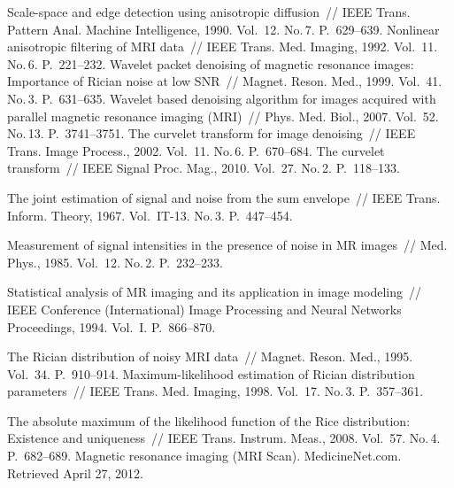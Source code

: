 \begin{multicols}{2}
{\small\frenchspacing
 {%
 \begin{thebibliography}{99}
 Scale-space and edge detection using anisotropic diffusion~// IEEE
Trans. Pattern Anal. Machine Intelligence, 1990. Vol.~12. No.\,7.
P.~629--639.
 Nonlinear anisotropic filtering of MRI
data~// IEEE Trans. Med. Imaging, 1992. Vol.~11. No.\,6. P.~221--232.
 Wavelet packet denoising of magnetic resonance images:
Importance of Rician noise at low SNR~// Magnet. Reson. Med., 1999. Vol.~41. No.\,3.
P.~631--635.
Wavelet based denoising algorithm for images acquired with
parallel magnetic resonance imaging (MRI)~// Phys. Med. Biol., 2007. Vol.~52. No.\,13.
P.~3741--3751.
 The curvelet transform for image
denoising~// IEEE Trans. Image Process., 2002. Vol.~11. No.\,6. P.~670--684.
 The curvelet transform~// IEEE Signal Proc. Mag., 2010.
Vol.~27. No.\,2. P.~118--133.

 The joint estimation of signal and noise from the sum
envelope~// IEEE Trans. Inform. Theory, 1967. Vol.~IT-13. No.\,3. P.~447--454.

 Measurement of signal intensities in the presence of noise in MR
images~// Med. Phys., 1985. Vol.~12. No.\,2. P.~232--233.

 Statistical analysis of MR imaging and its application in image
modeling~// IEEE  Conference (International) Image Processing and Neural Networks
Proceedings, 1994. Vol.~I. P.~866--870.


 The Rician distribution of noisy MRI data~// Magnet. Reson.
Med., 1995. Vol.~34. P.~910--914.
 Maximum-likelihood
estimation of Rician distribution parameters~// IEEE Trans. Med. Imaging, 1998.
Vol.~17. No.\,3. P.~357--361.

 The absolute maximum of the likelihood function of the
Rice distribution: Existence and uniqueness~// IEEE Trans. Instrum.
Meas., 2008. Vol.~57. No.\,4. P.~682--689.
 Magnetic resonance imaging (MRI Scan).
MedicineNet.com. Retrieved April 27, 2012.


\end{thebibliography}}}
\end{multicols}
